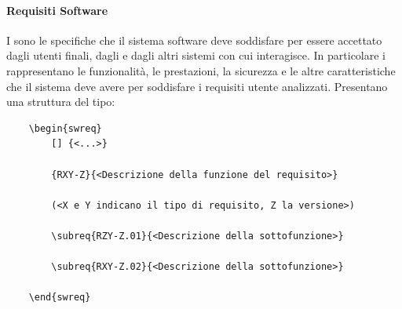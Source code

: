 \paragraph{Requisiti Software}
\label{par:requisiti_software}
I  sono le specifiche che il sistema software deve soddisfare per essere accettato dagli utenti finali, dagli  e dagli altri sistemi con cui interagisce.
In particolare i  rappresentano le funzionalità, le prestazioni, la sicurezza e le altre caratteristiche che il sistema deve avere per soddisfare i requisiti utente analizzati.
Presentano una struttura del tipo:

\begin{lstlisting}
    \begin{swreq}
        [] {<...>}
        
        {RXY-Z}{<Descrizione della funzione del requisito>}
    
        (<X e Y indicano il tipo di requisito, Z la versione>)

        \subreq{RZY-Z.01}{<Descrizione della sottofunzione>}
    
        \subreq{RXY-Z.02}{<Descrizione della sottofunzione>}
    
    \end{swreq}
\end{lstlisting}
